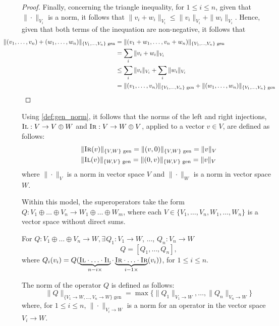 \begin{proof}
Finally, concerning the triangle inequality, for $ 1 \leq i \leq n$,  given that  $\|\cdot\|_{V_i}$ is a norm, it follows that $\|v_i + w_i\|_{V_i} \leq \|v_i\|_{V_i} + \|w_i\|_{V_i}$. Hence, given that both terms of the inequation are non-negative, it follows that
\begin{align*}
   \hspace {-30pt}\|(v_1, \ldots, v_n) + (w_1, \ldots, w_n)\|_{\{V_1,\ldots,V_n\} \text{ gen}} & = \|(v_1 + w_1, \ldots, v_n + w_n)\|_{\{V_1,\ldots,V_n\} \text{ gen}} \\
  & = \sum_i \|v_i + w_i\|_{V_i} \\
  &\leq \sum_i \|v_i\|_{V_i} + \sum_i \|w_i\|_{V_i} \\
  &=\|(v_1, \ldots, v_n)\|_{\{V_1,\ldots,V_n\} \text{ gen}} + \|(w_1, \ldots, w_n)\|_{\{V_1,\ldots,V_n\} \text{ gen}}  \\
\end{align*}
\end{proof}

Using \autoref{def:gen_norm}, it follows that the norms of the left and right injections, $\textsc{Il}: V \rightarrow V \oplus W$ and $\textsc{Ir}:V \rightarrow W \oplus V$, applied to a vector $v \in V$, are defined as follows:
  \begin{equation} \label{eq:gen_norm_injections}
    \begin{split}
    &\|\textsc{Ir}(v)\|_{\{V, W\} \text{ gen}} =  \| (v,0) \|_{\{ V, W\} \text{ gen}} = \|v\|_{V} \\
    &\|\textsc{Il}(v)\|_{\{ W,  V\} \text{ gen}} =  \| (0,v) \|_{\{ W,  V\} \text{ gen}} = \|v\|_{V}
    \end{split}
  \end{equation}
where $\|\cdot\|_{V}$ is a norm in vector space $V$ and $\|\cdot\|_{W}$ is a norm in vector space $W$.


 
Within this model, the superoperators take the form $Q: V_1 \oplus \ldots \oplus V_n  \rightarrow  W_1 \oplus \ldots \oplus W_m$, where each $V \in \{V_1, \ldots, V_n, W_1, \ldots, W_n\}$ is a vector space without direct sums.

\begin{definition} \label{def:gen_norm_either}
For $Q: V_1 \oplus \ldots \oplus V_n  \rightarrow W, \exists \hspace{1pt} Q_1: V_1 \rightarrow W$, $\ldots$, $Q_n: V_n \rightarrow W$  
$$Q=[Q_1, \ldots, Q_n],$$ 
where $Q_i (v_i) = Q (\underbrace{\textsc{Il} \cdot \ldots \cdot \textsc{Il}}_{n-i \times }  \cdot  \underbrace{\textsc{Ir} \cdot \ldots \cdot \textsc{Ir}}_{i-1 \times } (v_i))$, for $ 1 \leq i \leq n$.

The norm of the operator $Q$ is defined as follows:
\begin{equation}
\|Q\|_{\{V_1\rightarrow W, \ldots, V_n\rightarrow W\} \text{ gen}} = \max \{\|Q_1\|_{V_1 \rightarrow W}, \ldots, \|Q_n\|_{V_n \rightarrow W}  \}
\end{equation}
where, for $1 \leq i \leq n $, $\|\cdot \|_{V_i \rightarrow W}$ is a norm for an operator in the vector space $V_i \rightarrow W$.
\end{definition}


